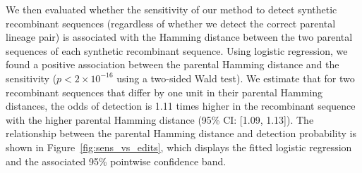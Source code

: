 \documentclass[11pt,oneside,letterpaper]{article}
\begin{document}



We then evaluated whether the sensitivity of our method to detect synthetic recombinant sequences (regardless of whether we detect the correct parental lineage pair) is associated with the Hamming distance between the two parental sequences of each synthetic recombinant sequence. Using logistic regression, we found a positive association between the parental Hamming distance and the sensitivity ($p < 2 \times 10^{-16}$ using a two-sided Wald test). We estimate that for two recombinant sequences that differ by one unit in their parental Hamming distances, the odds of detection is 1.11 times higher in the recombinant sequence with the higher parental Hamming distance (95\% CI: [1.09, 1.13]). The relationship between the parental Hamming distance and detection probability is shown in Figure~\ref{fig:sens_vs_edits}, which displays the fitted logistic regression and the associated 95\% pointwise confidence band.
\end{document}
